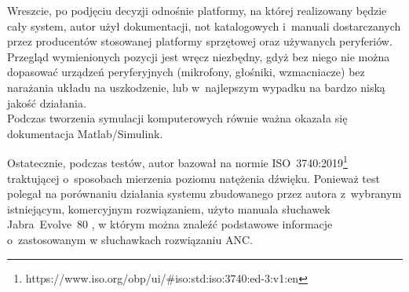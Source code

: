 Wreszcie, po podjęciu decyzji odnośnie platformy, na której realizowany będzie cały system, autor użył dokumentacji, not katalogowych i~manuali dostarczanych przez producentów stosowanej platformy sprzętowej oraz używanych peryferiów. Przegląd wymienionych pozycji jest wręcz niezbędny, gdyż bez niego nie można dopasować urządzeń peryferyjnych (mikrofony, głośniki, wzmacniacze) bez narażania układu na uszkodzenie, lub w~najlepszym wypadku na bardzo niską jakość działania.\\
Podczas tworzenia symulacji komputerowych równie ważna okazała się dokumentacja Matlab/Simulink. 

Ostatecznie, podczas testów, autor bazował na normie ISO~3740:2019\footnote{https://www.iso.org/obp/ui/\#iso:std:iso:3740:ed-3:v1:en} traktującej o~sposobach mierzenia poziomu natężenia d\'zwięku. Ponieważ test polegał na porównaniu działania systemu zbudowanego przez autora z~wybranym istniejącym, komercyjnym rozwiązaniem, użyto manuala słuchawek Jabra~Evolve~80 \cite{JabraEvolve80}, w którym można znale\'zć podstawowe informacje o~zastosowanym w słuchawkach rozwiązaniu ANC.